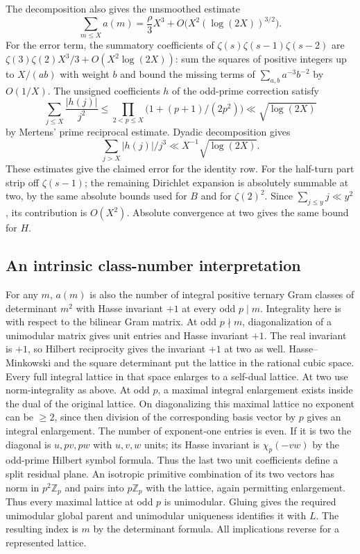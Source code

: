 The decomposition also gives the unsmoothed estimate
\[
 \sum_{m\le X}a(m)=\frac{\rho}{3}X^3+
 O\big(X^2(\log(2X))^{3/2}\big).
\]
For the error term, the summatory coefficients of
$\zeta(s)\zeta(s-1)\zeta(s-2)$ are
$\zeta(3)\zeta(2)X^3/3+O(X^2\log(2X))$: sum the squares of positive
integers up to $X/(a b)$ with weight $b$ and bound the missing terms
of $\sum_{a,b}a^{-3}b^{-2}$ by $O(1/X)$.
The unsigned coefficients $h$ of the odd-prime correction satisfy
\[
 \sum_{j\le X}\frac{|h(j)|}{j^2}\le
 \prod_{2<p\le X}\big(1+(p+1)/(2p^2)\big)\ll\sqrt{\log(2X)}
\]
by Mertens' prime reciprocal estimate. Dyadic decomposition gives
\[
 \sum_{j>X}|h(j)|/j^3\ll X^{-1}\sqrt{\log(2X)}.
\]
These estimates
give the claimed error for the identity row. For the half-turn part
strip off $\zeta(s-1)$; the remaining Dirichlet expansion is absolutely
summable at two, by the same absolute bounds used for $B$ and for
$\zeta(2)^2$. Since $\sum_{j\le y}j\ll y^2$, its contribution is
$O(X^2)$. Absolute convergence at two gives the same bound for $H$.

\subsection*{An intrinsic class-number interpretation}
For any $m$, $a(m)$ is also the number of integral positive ternary
Gram classes of determinant $m^2$ with Hasse invariant $+1$ at every
odd $p\mid m$. Integrality here is with respect to the bilinear Gram matrix.
At odd $p\nmid m$, diagonalization of a unimodular matrix gives
unit entries and Hasse invariant $+1$. The real invariant is $+1$,
so Hilbert reciprocity gives the invariant $+1$ at two as well.
Hasse--Minkowski and the square determinant put the lattice in the
rational cubic space. Every full integral lattice in that space
enlarges to a self-dual lattice. At two use norm-integrality as above.
At odd $p$, a maximal integral enlargement exists inside the dual of
the original lattice. On diagonalizing this maximal lattice no exponent
can be $\ge2$, since then division of the corresponding basis vector by
$p$ gives an integral enlargement. The number of exponent-one entries
is even. If it is two the diagonal is $u,pv,pw$ with $u,v,w$ units;
its Hasse invariant is $\chi_p(-vw)$ by the odd-prime Hilbert symbol
formula. Thus the last two unit coefficients define a split residual
plane. An isotropic primitive combination of its two vectors has
norm in $p^2\mathbb Z_p$ and pairs into $p\mathbb Z_p$ with the
lattice, again permitting enlargement. Thus every maximal lattice
at odd $p$ is unimodular. Gluing gives the required unimodular
global parent and unimodular uniqueness identifies it with $L$.
The resulting index is $m$ by the determinant formula. All implications
reverse for a represented lattice.

